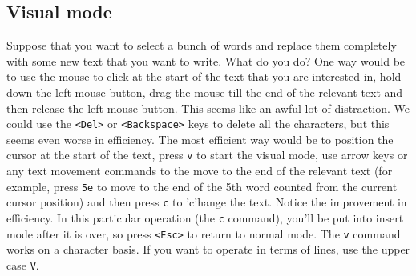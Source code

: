 \subsection{Visual mode} Suppose that you want to select a
bunch of words and replace them completely with some new text that you want to
write. What do you do? One way would be to use the mouse to click at the start
of the text that you are interested in, hold down the left mouse button, drag
the mouse till the end of the relevant text and then release the left mouse
button. This seems like an awful lot of distraction. We could use the
\texttt{<Del>} or \texttt{<Backspace>} keys to delete all the
characters, but this seems even worse in efficiency. The most efficient way
would be to position the cursor at the start of the text, press \texttt{v} to
start the visual mode, use arrow keys or any text movement commands to the move
to the end of the relevant text (for example, press \texttt{5e} to move to the
end of the 5th word counted from the current cursor position) and then press
\texttt{c} to 'c'hange the text. Notice the improvement in efficiency. In this
particular operation (the \texttt{c} command), you'll be put into insert mode
after it is over, so press \texttt{<Esc>} to return to normal mode. The
\texttt{v} command works on a character basis. If you want to operate in terms
of lines, use the upper case \texttt{V}. 
